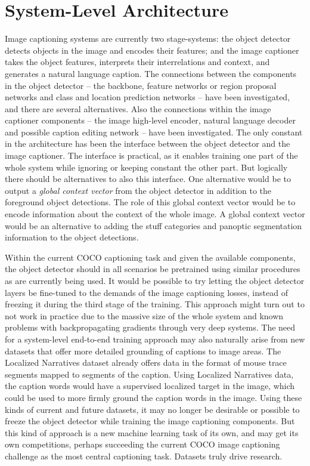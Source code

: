 \documentclass[english,twoside,openright]{HYgraduMLDS}
\begin{document}
\section{System-Level Architecture}
Image captioning systems are currently two stage-systems: the object detector detects objects in the image and encodes their features; and the image captioner takes the object features, interprets their interrelations and context, and generates a natural language caption. The connections between the components in the object detector -- the backbone, feature networks or region proposal networks and class and location prediction networks -- have been investigated, and there are several alternatives. Also the connections within the image captioner components -- the image high-level encoder, natural language decoder and possible caption editing network -- have been investigated. The only constant in the architecture has been the interface between the object detector and the image captioner. The interface is practical, as it enables training one part of the whole system while ignoring or keeping constant the other part. But logically there should be alternatives to also this interface. One alternative would be to output a \textit{global context vector} from the object detector in addition to the foreground object detections. The role of this global context vector would be to encode information about the context of the whole image. A global context vector would be an alternative to adding the stuff categories and panoptic segmentation information to the object detections. 

Within the current COCO captioning task and given the available components, the object detector should in all scenarios be pretrained using similar procedures as are currently being used. It would be possible to try letting the object detector layers be fine-tuned to the demands of the image captioning losses, instead of freezing it during the third stage of the training. This approach might turn out to not work in practice due to the massive size of the whole system and known problems with backpropagating gradients through very deep systems. The need for a system-level end-to-end training approach may also naturally arise from new datasets that offer more detailed grounding of captions to image areas. The Localized Narratives dataset already offers data in the format of mouse trace segments mapped to segments of the caption. Using Localized Narratives data, the caption words would have a supervised localized target in the image, which could be used to more firmly ground the caption words in the image. Using these kinds of current and future datasets, it may no longer be desirable or possible to freeze the object detector while training the image captioning components. But this kind of approach is a new machine learning task of its own, and may get its own competitions, perhaps succeeding the current COCO image captioning challenge as the most central captioning task. Datasets truly drive research.
\end{document}
